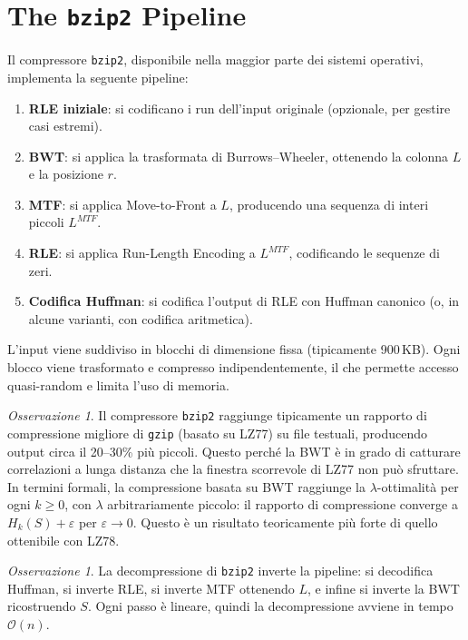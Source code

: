 \documentclass[12pt, a4paper, oneside]{book}
\theoremstyle{plain}
\theoremstyle{definition}
\theoremstyle{remark}
\newtheorem{osservazione}[teorema]{Osservazione}
\newcommand{\OO}[1]{\mathcal{O}\!\left(#1\right)}
\newcommand{\Hk}{H_k}
\begin{document}
\section{The \texttt{bzip2} Pipeline}
\label{sec:bzip2}

Il compressore \texttt{bzip2}, disponibile nella maggior parte dei sistemi operativi, implementa la seguente pipeline:

\begin{enumerate}
  \item \textbf{RLE iniziale}: si codificano i run dell'input originale (opzionale, per gestire casi estremi).
  \item \textbf{BWT}: si applica la trasformata di Burrows--Wheeler, ottenendo la colonna $L$ e la posizione $r$.
  \item \textbf{MTF}: si applica Move-to-Front a $L$, producendo una sequenza di interi piccoli $L^{MTF}$.
  \item \textbf{RLE}: si applica Run-Length Encoding a $L^{MTF}$, codificando le sequenze di zeri.
  \item \textbf{Codifica Huffman}: si codifica l'output di RLE con Huffman canonico (o, in alcune varianti, con codifica aritmetica).
\end{enumerate}

L'input viene suddiviso in blocchi di dimensione fissa (tipicamente 900\,KB). Ogni blocco viene trasformato e compresso indipendentemente, il che permette accesso quasi-random e limita l'uso di memoria.

\begin{osservazione}
Il compressore \texttt{bzip2} raggiunge tipicamente un rapporto di compressione migliore di \texttt{gzip} (basato su LZ77) su file testuali, producendo output circa il 20--30\% più piccoli. Questo perché la BWT è in grado di catturare correlazioni a lunga distanza che la finestra scorrevole di LZ77 non può sfruttare. In termini formali, la compressione basata su BWT raggiunge la $\lambda$-ottimalità per ogni $k \ge 0$, con $\lambda$ arbitrariamente piccolo: il rapporto di compressione converge a $\Hk(S) + \varepsilon$ per $\varepsilon \to 0$. Questo è un risultato teoricamente più forte di quello ottenibile con LZ78.
\end{osservazione}

\begin{osservazione}
La decompressione di \texttt{bzip2} inverte la pipeline: si decodifica Huffman, si inverte RLE, si inverte MTF ottenendo $L$, e infine si inverte la BWT ricostruendo $S$. Ogni passo è lineare, quindi la decompressione avviene in tempo $\OO{n}$.
\end{osservazione}
\end{document}
